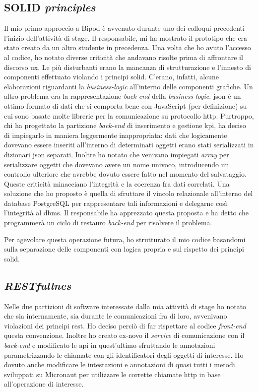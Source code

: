 \subsection{SOLID \textit{principles}}
Il mio primo approccio a Bipod è avvenuto durante uno dei colloqui precedenti l'inizio dell'attività di stage. Il responsabile, mi ha mostrato il prototipo che era stato creato da un altro studente in precedenza. Una volta che ho avuto l'accesso al codice, ho notato diverse criticità che andavano risolte prima di affrontare il discorso \acrshort{ux}. Le più disturbanti erano la mancanza di strutturazione e l'innesto di componenti effettuato violando i principi \gls{solid}\glsfirstoccur.
C'erano, infatti, alcune elaborazioni riguardanti la \textit{business-logic} all'interno delle componenti grafiche.
Un altro problema era la rappresentazione \textit{back-end} della \textit{business-logic}. \acrshort{json} è un ottimo formato di dati che si comporta bene con JavaScript (per definizione) su cui sono basate molte librerie per la comunicazione su protocollo \acrshort{http}.
Purtroppo, chi ha progettato la partizione \textit{back-end} di inserimento e gestione \acrshort{kpi}, ha deciso di impiegarlo in maniera leggermente inappropriata: dati che logicamente dovevano essere inseriti all'interno di determinati oggetti erano stati serializzati in dizionari \acrshort{json} separati. Inoltre ho notato che venivano impiegati \textit{array} per serializzare oggetti che dovevano avere un nome univoco, introducendo un controllo ulteriore che avrebbe dovuto essere fatto nel momento del salvataggio. Queste criticità minacciano l'integrità e la coerenza fra dati correlati. Una soluzione che ho proposto è quella di sfruttare il vincolo relazionale all'interno del database PostgreSQL per rappresentare tali informazioni e delegarne così l'integrità al \acrshort{dbms}. Il responsabile ha apprezzato questa proposta e ha detto che programmerà un ciclo di restauro \textit{back-end} per risolvere il problema.

Per agevolare questa operazione futura, ho strutturato il mio codice basandomi sulla separazione delle componenti con logica propria e sul rispetto dei principi \gls{solid}.
\subsection{\textit{RESTfullnes}}
Nelle due partizioni di software interessate dalla mia attività di stage ho notato che sia internamente, sia durante le comunicazioni fra di loro, avvenivano violazioni dei principi \acrshort{rest}. Ho deciso perciò di far rispettare al codice \textit{front-end} questa convenzione. Inoltre ho creato ex-novo il \textit{service} di comunicazione con il \textit{back-end} e modificato le \acrshort{api} in quest'ultimo sfruttando le annotazioni parametrizzando le chiamate con gli identificatori degli oggetti di interesse. Ho dovuto anche modificare le intestazioni e annotazioni di quasi tutti i metodi sviluppati su Micronaut per utilizzare le corrette chiamate \acrshort{http} in base all'operazione di interesse.

